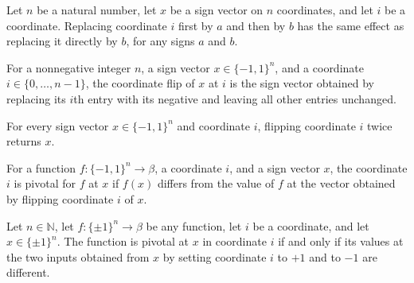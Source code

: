 \begin{theorem}
\label{FABL.setCoordinate_setCoordinate}
\leanok
{}
Let $n$ be a natural number, let $x$ be a sign vector on $n$ coordinates, and let $i$ be
a coordinate. Replacing coordinate $i$ first by $a$ and then by $b$ has the same effect
as replacing it directly by $b$, for any signs $a$ and $b$.
\end{theorem}

\begin{definition}
\label{FABL.flipCoordinate}
\leanok
{}
For a nonnegative integer $n$, a sign vector $x\in\{-1,1\}^n$, and a coordinate
$i\in\{0,\ldots,n-1\}$, the coordinate flip of $x$ at $i$ is the sign vector obtained by
replacing its $i$th entry with its negative and leaving all other entries unchanged.
\end{definition}

\begin{theorem}
\label{FABL.flipCoordinate_flipCoordinate}
\leanok
{}
For every sign vector $x\in\{−1,1\}^n$ and coordinate $i$, flipping coordinate $i$ twice
returns $x$.
\end{theorem}

\begin{definition}
\label{FABL.IsPivotal}
\leanok
{}
For a function $f:\{-1,1\}^n\to\beta$, a coordinate $i$, and a sign vector $x$, the
coordinate $i$ is pivotal for $f$ at $x$ if $f(x)$ differs from the value of $f$ at the
vector obtained by flipping coordinate $i$ of $x$.
\end{definition}

\begin{theorem}
\label{FABL.isPivotal_iff_setCoordinate_ne}
\leanok
{}
Let $n\in\mathbb N$, let $f:\{\pm1\}^n\to\beta$ be any function, let $i$ be a
coordinate, and let $x\in\{\pm1\}^n$. The function is pivotal at $x$ in coordinate $i$
if and only if its values at the two inputs obtained from $x$ by setting coordinate $i$
to $+1$ and to $-1$ are different.
\end{theorem}


